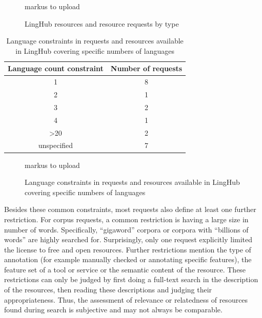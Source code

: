 \documentclass[smallextended]{svjour3}       %
\begin{document}

\begin{figure}
    markus to upload
    \caption{\label{fig:req-by-type}LingHub resources and resource requests by
type}
\end{figure}

\begin{table}
    \begin{tabular}{c|c}
    Language count constraint & Number of requests \\
    \hline
    1                         & 8                  \\
    2                         & 1                  \\
    3                         & 2                  \\
    4                         & 1                  \\
    \textgreater 20                      & 2                  \\
    unspecified               & 7                  \\
\end{tabular}
    \caption{\label{tab:language-constraints}  Language constraints in requests
        and resources available in LingHub covering specific numbers of
    languages}
\end{table}

\begin{figure}
    markus to upload
    \caption{\label{fig:language-constraints} Language constraints in requests
        and resources available in LingHub covering specific numbers of
    languages}
\end{figure}

Besides these common constraints, most requests also define at least one further
restriction. For corpus requests, a common restriction is having a large size in
number of words. Specifically, “gigaword” corpora or corpora with “billions of
words” are highly searched for. Surprisingly, only one request explicitly
limited the license to free and open resources. Further restrictions mention the
type of annotation (for example manually checked or annotating specific
features), the feature set of a tool or service or the semantic content of the
resource. These restrictions can only be judged by first doing a full-text
search in the description of the resources, then reading these descriptions and
judging their appropriateness. Thus, the assessment of relevance or relatedness
of resources found during search is subjective and may not always be comparable.
\end{document}
